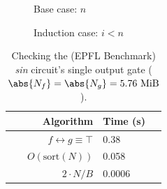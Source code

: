 \documentclass[english, aspectratio=169]{beamer}
\newcommand{\sort}[0]{\text{sort}}
\begin{document}
\begin{frame}

  \begin{figure}
    \centering

    \begin{tikzpicture}[scale=0.9, every node/.style={transform shape}]
      
    \end{tikzpicture}

    \caption{Base case: $n$}
  \end{figure}
  
\end{frame}

\begin{frame}
  
  \begin{figure}
    \centering

    \begin{tikzpicture}[scale=0.85, every node/.style={transform shape}]
      
    \end{tikzpicture}

    \caption{Induction case: $i < n$}
  \end{figure}
  
\end{frame}


\blankframe

\begin{frame}

  \begin{table}
    \centering
    \begin{tabular}{r | l}
      Algorithm                         & Time (s)
      \\ \hline
      $f \leftrightarrow g \equiv \top$ & 0.38
      \\
      $O(\sort(N))$                     & 0.058
      \\
      $2 \cdot N/B$                     & 0.0006
    \end{tabular}

    \caption{Checking the (EPFL Benchmark) \emph{sin} circuit's single output
      gate ($\abs{N_f} = \abs{N_g} = 5.76~\text{MiB}$).}
  \end{table}
  
\end{frame}
\end{document}
